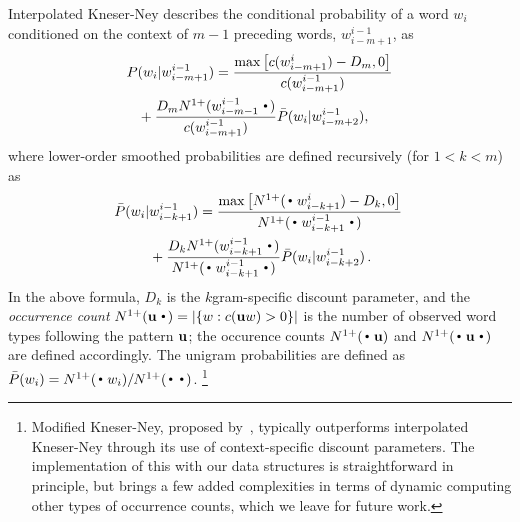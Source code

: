 Interpolated Kneser-Ney describes the conditional probability of a word $w_i$ conditioned on the context of $m-1$ preceding words, $w_{i-m+1}^{i-1}$, as 
\begin{align}
P(w_i |& w_{i-m+1}^{i-1})=\frac{\max\left[c(w^{i}_{i-m+1}) - D_m,0\right]}{c(w^{i-1}_{i-m+1})} \nonumber \\
& \hspace{-6mm} +\frac{D_m \nlplus{w^{i-1}_{i-m-1}\Bigcdot} }{c(w^{i-1}_{i-m+1})}  
\bar{P}(w_i | w_{i-m+2}^{i-1}) ,  
\label{eq:high}
\end{align}
where lower-order smoothed probabilities are defined recursively (for $1<k<m$) as 
\begin{align}
\! \bar{P}(w_i |& w_{i-k+1}^{i-1})
 = \frac{\max\left[\nlplus{\Bigcdot w_{i-k+1}^{i}} - D_k,0\right]}{\nlplus{\Bigcdot w_{i-k+1}^{i-1} \Bigcdot}} \nonumber \\
&+ \frac{D_k \nlplus{w_{i-k+1}^{i-1}\Bigcdot}}{\nlplus{\Bigcdot w_{i-k+1}^{i-1} \Bigcdot}} \bar{P}(w_i | w_{i-k+2}^{i-1}) \,  . \! \label{eq:mid}
\end{align}
In the above formula, $D_k$ is the $k$gram-specific discount parameter, and 
the \emph{occurrence count} 
\mbox{$\nlplus{\uu\Bigcdot} = |\{w: c(\uu w)>0\}|$} 
is the number of observed word types following the pattern ${\mathbf{u}}$; 
the occurence counts $\nlplus{\Bigcdot\uu}$ and $\nlplus{\Bigcdot\uu\Bigcdot}$ 
are defined accordingly.
The unigram probabilities are defined as
%
$ \bar{P}(w_i) = \nlplus{\Bigcdot w_i} / \nlplus{\Bigcdot\Bigcdot}$.%
\footnote{Modified Kneser-Ney, proposed
  by~, typically outperforms interpolated
  Kneser-Ney through its use of context-specific discount parameters.
The implementation of this with our data structures is straightforward in principle, but brings a few added complexities in terms of dynamic computing other types of occurrence counts, which we leave for future work.}



